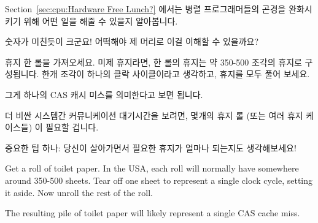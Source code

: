 \begin{enumerate}
	Section~\ref{sec:cpu:Hardware Free Lunch?} 에서는 병렬 프로그래머들의
	곤경을 완화시키기 위해 어떤 일을 해줄 수 있을지 알아봅니다.

\QuickQ{}
	숫자가 미친듯이 크군요!
	어떡해야 제 머리로 이걸 이해할 수 있을까요?

\QuickA{}
	휴지 한 롤을 가져오세요.
	미제 휴지라면, 한 롤의 휴지는 약 350-500 조각의 휴지로 구성됩니다.
	한개 조각이 하나의 클락 사이클이라고 생각하고, 휴지를 모두 풀어 보세요.

	그게 하나의 CAS 캐시 미스를 의미한다고 보면 됩니다.

	더 비싼 시스템간 커뮤니케이션 대기시간을 보려면, 몇개의 휴지 롤 (또는
	여러 휴지 케이스들) 이 필요할 겁니다.

	중요한 팁 하나: 당신이 살아가면서 필요한 휴지가 얼마나 되는지도
	생각해보세요!

	\iffalse
	Get a roll of toilet paper.
	In the USA, each roll will normally have somewhere around 350-500
	sheets.
	Tear off one sheet to represent a single clock cycle, setting it aside.
	Now unroll the rest of the roll.

	The resulting pile of toilet paper will likely represent a single
	CAS cache miss.


\end{enumerate}
